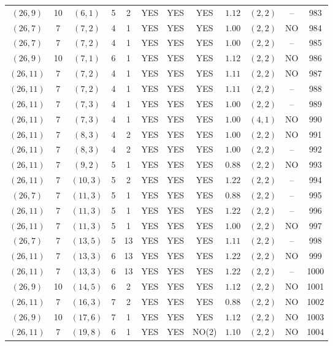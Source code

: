 \begin{longtable}{|c|c|c|c|c|c|c|c|c|c|c|c|}
$(26,9)$ & 10 & $(6,1)$ & 5 & 2 & YES & YES & YES & $1.12$ & $(2,2)$ & -- & 983\\
$(26,7)$ & 7 & $(7,2)$ & 4 & 1 & YES & YES & YES & $1.00$ & $(2,2)$ & NO & 984\\
$(26,7)$ & 7 & $(7,2)$ & 4 & 1 & YES & YES & YES & $1.00$ & $(2,2)$ & -- & 985\\
$(26,9)$ & 10 & $(7,1)$ & 6 & 1 & YES & YES & YES & $1.12$ & $(2,2)$ & NO & 986\\
$(26,11)$ & 7 & $(7,2)$ & 4 & 1 & YES & YES & YES & $1.11$ & $(2,2)$ & NO & 987\\
$(26,11)$ & 7 & $(7,2)$ & 4 & 1 & YES & YES & YES & $1.11$ & $(2,2)$ & -- & 988\\
$(26,11)$ & 7 & $(7,3)$ & 4 & 1 & YES & YES & YES & $1.00$ & $(2,2)$ & -- & 989\\
$(26,11)$ & 7 & $(7,3)$ & 4 & 1 & YES & YES & YES & $1.00$ & $(4,1)$ & NO & 990\\
$(26,11)$ & 7 & $(8,3)$ & 4 & 2 & YES & YES & YES & $1.00$ & $(2,2)$ & NO & 991\\
$(26,11)$ & 7 & $(8,3)$ & 4 & 2 & YES & YES & YES & $1.00$ & $(2,2)$ & -- & 992\\
$(26,11)$ & 7 & $(9,2)$ & 5 & 1 & YES & YES & YES & $0.88$ & $(2,2)$ & NO & 993\\
$(26,11)$ & 7 & $(10,3)$ & 5 & 2 & YES & YES & YES & $1.22$ & $(2,2)$ & -- & 994\\
$(26,7)$ & 7 & $(11,3)$ & 5 & 1 & YES & YES & YES & $0.88$ & $(2,2)$ & -- & 995\\
$(26,11)$ & 7 & $(11,3)$ & 5 & 1 & YES & YES & YES & $1.22$ & $(2,2)$ & -- & 996\\
$(26,11)$ & 7 & $(11,3)$ & 5 & 1 & YES & YES & YES & $1.00$ & $(2,2)$ & NO & 997\\
$(26,7)$ & 7 & $(13,5)$ & 5 & 13 & YES & YES & YES & $1.11$ & $(2,2)$ & -- & 998\\
$(26,11)$ & 7 & $(13,3)$ & 6 & 13 & YES & YES & YES & $1.22$ & $(2,2)$ & NO & 999\\
$(26,11)$ & 7 & $(13,3)$ & 6 & 13 & YES & YES & YES & $1.22$ & $(2,2)$ & -- & 1000\\
$(26,9)$ & 10 & $(14,5)$ & 6 & 2 & YES & YES & YES & $1.12$ & $(2,2)$ & NO & 1001\\
$(26,11)$ & 7 & $(16,3)$ & 7 & 2 & YES & YES & YES & $0.88$ & $(2,2)$ & NO & 1002\\
$(26,9)$ & 10 & $(17,6)$ & 7 & 1 & YES & YES & YES & $1.12$ & $(2,2)$ & NO & 1003\\
$(26,11)$ & 7 & $(19,8)$ & 6 & 1 & YES & YES & NO(2) & $1.10$ & $(2,2)$ & NO & 1004\\

\end{longtable}
